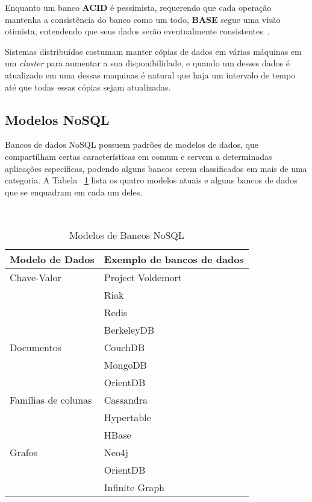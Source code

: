 Enquanto um banco \textbf{ACID} é pessimista, requerendo que cada operação mantenha a consistência do banco como um todo, \textbf{BASE} segue uma visão otimista, entendendo que seus dados serão eventualmente consistentes~\cite{pritchett2008}.

Sistemas distribuídos costumam manter cópias de dados em várias máquinas em um \emph{cluster} para aumentar a sua disponibilidade, e quando um desses dados é atualizado em uma dessas maquinas é natural que haja um intervalo de tempo até que todas essas cópias sejam atualizadas.

\subsection{Modelos NoSQL}
Bancos de dados NoSQL possuem padrões de modelos de dados, que compartilham certas características em comum e servem a determinadas aplicações específicas, podendo alguns bancos serem classificados em mais de uma categoria. A Tabela ~\ref{tab:modelosnosql} lista os quatro modelos atuais e alguns bancos de dados que se enquadram em cada um deles.

~\begin{table}[]
	\centering
	\caption{Modelos de Bancos NoSQL}
	\label{tab:modelosnosql}
	\begin{tabular}{ll}
		\textbf{Modelo de Dados}     & \textbf{Exemplo de bancos de dados}      \\ \hline
		Chave-Valor         & Project Voldemort               \\
		& Riak                            \\
		& Redis                           \\
		& BerkeleyDB                      \\ \hline
		Documentos          & CouchDB                         \\
		& MongoDB                         \\
		& OrientDB                        \\ \hline
		Famílias de colunas & Cassandra                       \\
		& Hypertable                      \\
		& HBase                           \\ \hline
		Grafos              & Neo4j \\
		& OrientDB                        \\
		& Infinite Graph                 
	\end{tabular}
\end{table}

